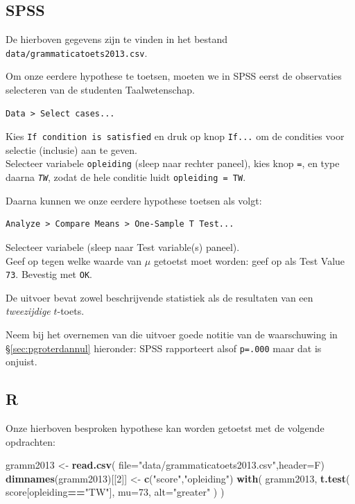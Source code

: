 \documentclass[
]{book}
\newenvironment{Shaded}{\begin{snugshade}}{\end{snugshade}}
\newcommand{\DataTypeTok}[1]{\textcolor[rgb]{0.13,0.29,0.53}{#1}}
\newcommand{\DecValTok}[1]{\textcolor[rgb]{0.00,0.00,0.81}{#1}}
\newcommand{\KeywordTok}[1]{\textcolor[rgb]{0.13,0.29,0.53}{\textbf{#1}}}
\newcommand{\NormalTok}[1]{#1}
\newcommand{\OperatorTok}[1]{\textcolor[rgb]{0.81,0.36,0.00}{\textbf{#1}}}
\newcommand{\StringTok}[1]{\textcolor[rgb]{0.31,0.60,0.02}{#1}}
\begin{document}
\hypertarget{spss-10}{%
\subsection{SPSS}\label{spss-10}}

De hierboven gegevens zijn te vinden in het bestand \texttt{data/grammaticatoets2013.csv}.

Om onze eerdere hypothese te toetsen, moeten we in SPSS eerst de
observaties selecteren van de studenten Taalwetenschap.

\begin{verbatim}
Data > Select cases...
\end{verbatim}

Kies \texttt{If\ condition\ is\ satisfied} en druk op knop \texttt{If...} om de condities
voor selectie (inclusie) aan te geven.\\
Selecteer variabele \texttt{opleiding} (sleep naar rechter paneel), kies knop
\texttt{=}, en type daarna \emph{\texttt{TW}}, zodat de hele conditie luidt
\texttt{opleiding\ =\ TW}.

Daarna kunnen we onze eerdere hypothese toetsen als volgt:

\begin{verbatim}
Analyze > Compare Means > One-Sample T Test...
\end{verbatim}

Selecteer variabele (sleep naar Test variable(s) paneel).\\
Geef op tegen welke waarde van \(\mu\) getoetst moet worden: geef op als
Test Value \texttt{73}. Bevestig met \texttt{OK}.

De uitvoer bevat zowel beschrijvende statistiek als de resultaten van
een \emph{tweezijdige} \(t\)-toets.

Neem bij het overnemen van die uitvoer goede notitie van de waarschuwing in
§\ref{sec:pgroterdannul} hieronder: SPSS rapporteert alsof \texttt{p=.000} maar dat is onjuist.

\hypertarget{r-11}{%
\subsection{R}\label{r-11}}

Onze hierboven besproken hypothese kan worden getoetst met de volgende opdrachten:

\begin{Shaded}
\begin{Highlighting}[]
\NormalTok{gramm2013 \textless{}{-}}\StringTok{ }\KeywordTok{read.csv}\NormalTok{( }\DataTypeTok{file=}\StringTok{"data/grammaticatoets2013.csv"}\NormalTok{,}\DataTypeTok{header=}\NormalTok{F)}
\KeywordTok{dimnames}\NormalTok{(gramm2013)[[}\DecValTok{2}\NormalTok{]] \textless{}{-}}\StringTok{ }\KeywordTok{c}\NormalTok{(}\StringTok{"score"}\NormalTok{,}\StringTok{"opleiding"}\NormalTok{)}
\KeywordTok{with}\NormalTok{( gramm2013,}
      \KeywordTok{t.test}\NormalTok{( score[opleiding}\OperatorTok{==}\StringTok{"TW"}\NormalTok{], }\DataTypeTok{mu=}\DecValTok{73}\NormalTok{, }\DataTypeTok{alt=}\StringTok{"greater"}\NormalTok{ ) )}
\end{Highlighting}
\end{Shaded}
\end{document}
